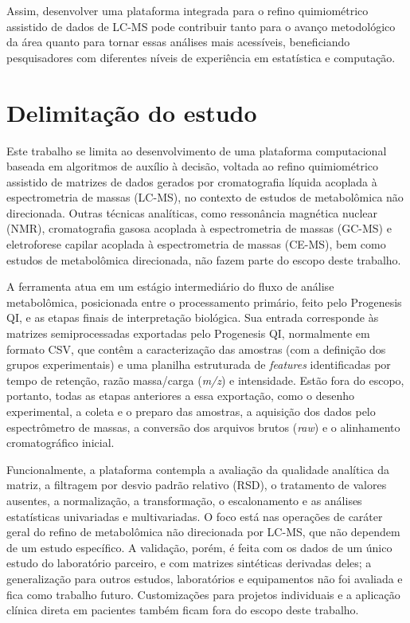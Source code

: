 Assim, desenvolver uma plataforma integrada para o refino quimiométrico assistido de dados de LC-MS pode contribuir tanto para o avanço metodológico da área quanto para tornar essas análises mais acessíveis, beneficiando pesquisadores com diferentes níveis de experiência em estatística e computação.

\section{Delimitação do estudo}

Este trabalho se limita ao desenvolvimento de uma plataforma computacional baseada em algoritmos de auxílio à decisão, voltada ao refino quimiométrico assistido de matrizes de dados gerados por cromatografia líquida acoplada à espectrometria de massas (LC-MS), no contexto de estudos de metabolômica não direcionada. Outras técnicas analíticas, como ressonância magnética nuclear (NMR), cromatografia gasosa acoplada à espectrometria de massas (GC-MS) e eletroforese capilar acoplada à espectrometria de massas (CE-MS), bem como estudos de metabolômica direcionada, não fazem parte do escopo deste trabalho.

A ferramenta atua em um estágio intermediário do fluxo de análise metabolômica, posicionada entre o processamento primário, feito pelo Progenesis QI, e as etapas finais de interpretação biológica. Sua entrada corresponde às matrizes semiprocessadas exportadas pelo Progenesis QI, normalmente em formato CSV, que contêm a caracterização das amostras (com a definição dos grupos experimentais) e uma planilha estruturada de \textit{features} identificadas por tempo de retenção, razão massa/carga (\textit{m/z}) e intensidade. Estão fora do escopo, portanto, todas as etapas anteriores a essa exportação, como o desenho experimental, a coleta e o preparo das amostras, a aquisição dos dados pelo espectrômetro de massas, a conversão dos arquivos brutos (\textit{raw}) e o alinhamento cromatográfico inicial.

Funcionalmente, a plataforma contempla a avaliação da qualidade analítica da matriz, a filtragem por desvio padrão relativo (RSD), o tratamento de valores ausentes, a normalização, a transformação, o escalonamento e as análises estatísticas univariadas e multivariadas. O foco está nas operações de caráter geral do refino de metabolômica não direcionada por LC-MS, que não dependem de um estudo específico. A validação, porém, é feita com os dados de um único estudo do laboratório parceiro, e com matrizes sintéticas derivadas deles; a generalização para outros estudos, laboratórios e equipamentos não foi avaliada e fica como trabalho futuro. Customizações para projetos individuais e a aplicação clínica direta em pacientes também ficam fora do escopo deste trabalho.